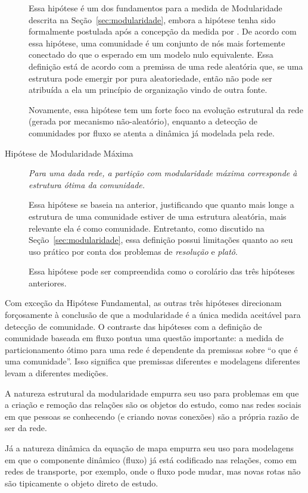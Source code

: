 \documentclass[12pt,a4paper]{article}
\begin{document}
\begin{description}
Essa hipótese é um dos fundamentos para a medida de Modularidade descrita na Seção~\ref{sec:modularidade}, embora a hipótese tenha sido formalmente postulada após a concepção da medida por . De acordo com essa hipótese, uma comunidade é um conjunto de nós mais fortemente conectado do que o esperado em um modelo nulo equivalente. Essa definição está de acordo com a premissa de uma rede aleatória que, se uma estrutura pode emergir por pura aleatoriedade, então não pode ser atribuída a ela um princípio de organização vindo de outra fonte.

Novamente, essa hipótese tem um forte foco na evolução estrutural da rede (gerada por mecanismo não-aleatório), enquanto a detecção de comunidades por fluxo se atenta a dinâmica já modelada pela rede.

\item [Hipótese de Modularidade Máxima] \textit{Para uma dada rede, a partição com modularidade máxima corresponde à estrutura ótima da comunidade.}

Essa hipótese se baseia na anterior, justificando que quanto mais longe a estrutura de uma comunidade estiver de uma estrutura aleatória, mais relevante ela é como comunidade. Entretanto, como discutido na Seção~\ref{sec:modularidade}, essa definição possui limitações quanto ao seu uso prático por conta dos problemas de \textit{resolução} e \textit{platô}.

Essa hipótese pode ser compreendida como o corolário das três hipóteses anteriores. 

\end{description}

Com exceção da Hipótese Fundamental, as outras três hipóteses direcionam forçosamente à conclusão de que a modularidade é a única medida aceitável para detecção de comunidade. O contraste das hipóteses com a definição de comunidade baseada em fluxo pontua uma questão importante: a medida de particionamento ótimo para uma rede é dependente da premissas sobre \enquote{o que é uma comunidade}. Isso significa que premissas diferentes e modelagens diferentes levam a diferentes medições.

A natureza estrutural da modularidade empurra seu uso para problemas em que a criação e remoção das relações são os objetos do estudo, como nas redes sociais em que pessoas se conhecendo (e criando novas conexões) são a própria razão de ser da rede.

Já a natureza dinâmica da equação de mapa empurra seu uso para modelagens em que o componente dinâmico (fluxo) já está codificado nas relações, como em redes de transporte, por exemplo, onde o fluxo pode mudar, mas novas rotas não são tipicamente o objeto direto de estudo.
\end{document}
